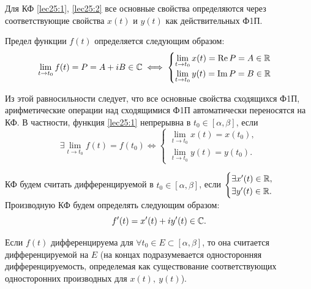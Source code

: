 \documentclass[../../main.tex]{subfiles}
\begin{document}
Для КФ \eqref{lec25:1}, \eqref{lec25:2}  все основные свойства определяются
через соответствующие свойства $x(t)$ и $y(t)$ как действительных Ф1П.

Предел функции $f(t)$ определяется следующим образом: 
\[
\lim\limits_{t \to t_0}  f(t) = P = A + iB \in \mathbb{C} \iff
\begin{cases}
	\lim\limits_{t \to t_0}  x(t)  = \operatorname{Re} P = A \in \mathbb{R} \\
	\lim\limits_{t \to t_0}  y(t)  = \operatorname{Im} P = B \in \mathbb{R}
\end{cases} 
\]

Из этой равносильности следует, 
что  все основные свойства сходящихся Ф1П,
арифметические операции над сходящимися Ф1П автоматически переносятся на КФ.
В частности, функция \eqref{lec25:1} непрерывна в $t_0 \in [\alpha,\beta ]$,
если
\[\exists \lim\limits_{t \to t_0}  f(t) = f(t_0) \iff 
\begin{cases}
	\lim\limits_{t \to t_0}  x(t)  = x(t_0), \\
	\lim\limits_{t \to t_0}  y(t)  =  y(t_0).
\end{cases}\]

КФ будем считать дифференцируемой в $t_0 \in [\alpha,\beta ]$,  если 
$\begin{cases}
	\exists x'(t)  \in \mathbb{R}, \\
	\exists y'(t)  \in \mathbb{R}.
\end{cases}$ Производную КФ будем определять следующим образом:
\[
	f'(t) = x'(t) + iy'(t) \in \mathbb{C}.
\]

Если $f(t)$ дифференцируема для $\forall t_0 \in E \subset [\alpha,\beta ]$, 
то она считается дифференцируемой на $E$ (на концах 
подразумевается односторонняя дифференцируемость,
определемая как существование соответствующих 
односторонних производных для $x(t), \ y(t)$).
\end{document}
